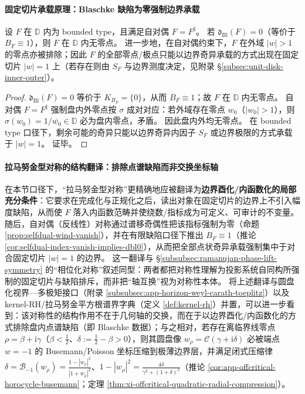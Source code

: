 \paragraph{固定切片承载原理：Blaschke 缺陷为零强制边界承载}
\begin{theorem}\label{thm:blaschke-defect-zero-fixed-slice-support}
设 \(F\) 在 \(\mathbb{D}\) 内为 bounded type，且满足自对偶 \(F=F^\sharp\)。
若 \(\mathfrak{d}_{\mathrm{Bl}}(F)=0\)（等价于 \(B_F\equiv 1\)），则 \(F\) 在 \(\mathbb{D}\) 内无零点。
进一步地，在自对偶约束下，\(F\) 在外域 \(|w|>1\) 的零点亦被排除；因此 \(F\) 的全部零点/极点只能以边界奇异承载的方式出现在固定切片 \(|w|=1\) 上（若存在则由 \(S_F\) 与边界测度决定，见附录 \S\ref{subsec:unit-disk-inner-outer}）。
\end{theorem}

\begin{proof}
\(\mathfrak{d}_{\mathrm{Bl}}(F)=0\) 等价于 \(K_{B_F}=\{0\}\)，从而 \(B_F\equiv 1\)；故 \(F\) 在 \(\mathbb{D}\) 内无零点。
自对偶 \(F=F^\sharp\) 强制盘内外零点按 \(\sigma\) 成对对应：若外域存在零点 \(w_0\)（\(|w_0|>1\)），则 \(\sigma(w_0)=1/\overline{w_0}\in\mathbb{D}\) 必为盘内零点，矛盾。
因此盘内外均无零点。
在 bounded type 口径下，剩余可能的奇异只能以边界奇异内因子 \(S_F\) 或边界极限的方式承载于 \(|w|=1\)。
证毕。
\end{proof}

\paragraph{拉马努金型对称的结构翻译：排除点谱缺陷而非交换坐标轴}
在本节口径下，“拉马努金型对称”更精确地应被翻译为\textbf{边界酉化/内函数化的局部充分条件}：它要求在完成化与正规化之后，读出对象在固定切片的边界上不引入幅度缺陷，从而使 \(F\) 落入内函数范畴并使绕数/指标成为可定义、可审计的不变量。随后，自对偶（反线性）对称通过谱移奇偶性把该指标强制为零（命题 \ref{prop:selfdual-wind-vanish}），并在有限缺陷口径下推出 \(B_F\equiv 1\)（推论 \ref{cor:selfdual-index-vanish-implies-dbl0}），从而把全部点状奇异承载强制集中于对合固定切片 \(|w|=1\) 的边界。
这一翻译与 \S\ref{subsubsec:ramanujan-phase-lift-symmetry} 的“相位化对称”叙述同型：两者都把对称性理解为投影系统自同构所强制的固定切片与缺陷排斥，而非把“轴互换”视为对称性本体。
将上述翻译与圆盘化视界—多极矩接口（附录 \ref{subsubsec:app-horizon-weyl-carath-toeplitz}）以及 kernel-RH/拉马努金平方根谱界字典（定义 \ref{def:kernel-rh}）并置，可以进一步看到：该对称性的结构作用不在于几何轴的交换，而在于以边界酉化/内函数化的方式排除盘内点谱缺陷（即 Blaschke 数据）；与之相对，若存在离临界线零点 \(\rho=\beta+\mathrm{i}\gamma\)（\(\beta<\tfrac12\)、\(\delta:=\tfrac12-\beta>0\)），则其圆盘像 \(w_\rho=\mathcal{C}(\gamma+\mathrm{i}\delta)\) 必被端点 \(w=-1\) 的 Busemann/Poisson 坐标压缩到极薄边界层，并满足闭式压缩律 \(\delta=\mathcal{B}_{-1}(w_\rho)=\frac{1-|w_\rho|^2}{|1+w_\rho|^2}\)、\(1-|w_\rho|^2=\frac{4\delta}{\gamma^2+(1+\delta)^2}\)（推论 \ref{cor:app-offcritical-horocycle-busemann}；定理 \ref{thm:xi-offcritical-quadratic-radial-compression}）。

